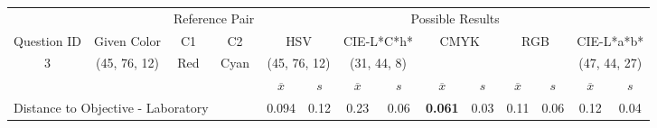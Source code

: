\begin{table}[H]
  \resizebox{\textwidth}{!} {
  \begin{tabular}{lccccccccccccc}
    \hline
    \multicolumn{1}{c}{}                              &                                      & \multicolumn{2}{c}{Reference Pair}                   & \multicolumn{10}{c}{Possible Results}                                                                                                                                                                                                                                                                                        \\ \cline{3-14}
    \multicolumn{1}{c}{\multirow{-2}{*}{Question ID}} & \multirow{-2}{*}{Given Color}        & C1                       & C2                         & \multicolumn{2}{c}{HSV}                                        & \multicolumn{2}{c}{CIE-L*C*h*}                                 & \multicolumn{2}{c}{CMYK}                                       & \multicolumn{2}{c}{RGB}                                        & \multicolumn{2}{c}{CIE-L*a*b*}                                 \\ \hline
    \multicolumn{1}{c}{3}                             & \cellcolor[HTML]{80FF00}(45, 76, 12) & \multicolumn{1}{c|}{Red} & \multicolumn{1}{c|}{Cyan}  & \multicolumn{2}{c|}{\cellcolor[HTML]{80FF00}(45, 76, 12)}      & \multicolumn{2}{c|}{\cellcolor[HTML]{91C01D}(31, 44, 8)}       & \multicolumn{2}{c|}{\cellcolor[HTML]{808080}{\color[HTML]{FFFFFF}(21, 22, 24)}}       & \multicolumn{2}{c|}{\cellcolor[HTML]{808080}{\color[HTML]{FFFFFF}(21, 22, 24)}}       & \multicolumn{2}{c|}{\cellcolor[HTML]{DDA581}(47, 44, 27)}       \\ \hline
                                                      & \multicolumn{1}{l}{}                 & \multicolumn{1}{l}{}     & \multicolumn{1}{l}{}       & \multicolumn{1}{c}{$\overline{x}$} & \multicolumn{1}{c}{$s$} & \multicolumn{1}{c}{$\overline{x}$} & \multicolumn{1}{c}{$s$} & \multicolumn{1}{c}{$\overline{x}$} & \multicolumn{1}{c}{$s$} & \multicolumn{1}{c}{$\overline{x}$} & \multicolumn{1}{c}{$s$} & \multicolumn{1}{c}{$\overline{x}$} & \multicolumn{1}{c}{$s$} \\ \hline
    \multicolumn{4}{l}{Distance to Objective - Laboratory}                                                                                           & \multicolumn{1}{|c}{0.094}       & \multicolumn{1}{c|}{0.12}    & \multicolumn{1}{|c}{0.23}       & \multicolumn{1}{c|}{0.06}    & \multicolumn{1}{|c}{\textbf{0.061}}       & \multicolumn{1}{c|}{0.03}    & \multicolumn{1}{|c}{0.11}       & \multicolumn{1}{c|}{0.06}    & \multicolumn{1}{|c}{0.12}       & \multicolumn{1}{c|}{0.04}    \\

\end{tabular}}
\end{table}
